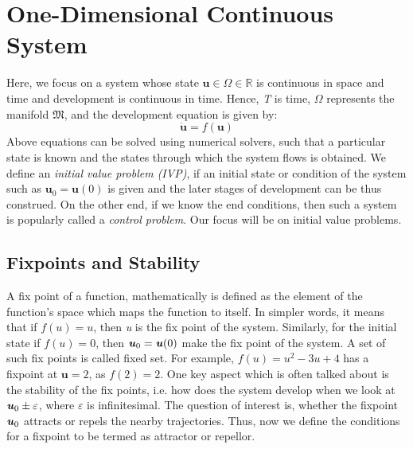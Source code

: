 \section{One-Dimensional Continuous System}
Here, we focus on a system whose state $ \textbf{u}\in\Omega\in\mathbb{R} $ is continuous in space and time and development is continuous in time. Hence, \textit{T} is time, $\Omega$ represents the manifold $ \mathfrak{M} $, and the development equation is given by:
\begin{equation}
\dot{\mathbf{u}} = \textit{f}{\left( \textbf{u}\right) }
\end{equation}
Above equations can be solved using numerical solvers, such that a particular state is known and the states through which the system flows is obtained. We define an \textit{initial value problem (IVP)}, if an initial state or condition of the system such as $ \textbf{u}_{0}=\textbf{u}(0) $ is given and the later stages of development can be thus construed. On the other end, if we know the end conditions, then such a system is popularly called a \textit{control problem}. Our focus will be on initial value problems.

\subsection{Fixpoints and Stability} \label{fixpoints}
A fix point of a function, mathematically is defined as the element of the function’s space which maps the function to itself. In simpler words, it means that if $\textit{f}(\textit{u})=\textit{u}$, then \textit{u} is the fix point of the system. Similarly, for the initial state if $\textit{f}(\textit{u})=0$, then $ \textbf{\textit{u}}_{0}=\textbf{\textit{u}}(0) $ make the fix point of the system. A set of such fix points is called fixed set. For example, $\textit{f}(\textit{u})= \textit{u}^{2}-3\textit{u}+4 $ has a fixpoint at $\textbf{u}=2$, as $\textit{f}(2)=2 $.
One key aspect which is often talked about is the stability of the fix points, i.e. how does the system develop when we look at $\textbf{\textit{u}}_{0}\pm \varepsilon $, where $\varepsilon$ is infinitesimal.  The question of interest is, whether the fixpoint $ \textbf{\textit{u}}_{0} $ attracts or repels the nearby trajectories. Thus, now we define the conditions for a fixpoint to be termed as attractor or repellor.

